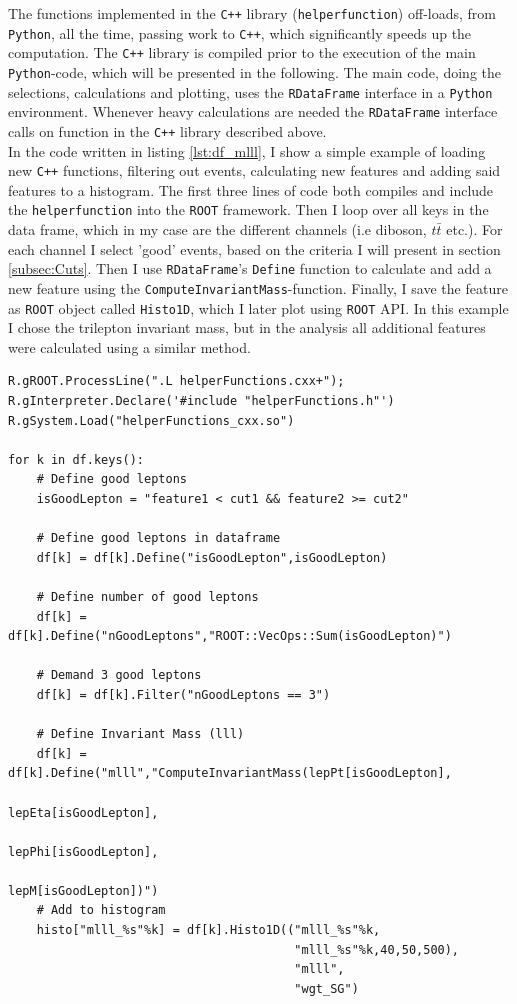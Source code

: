 The functions implemented in the \verb!C++! library (\texttt{helperfunction}) off-loads, from \verb!Python!, all the time, passing work to \verb!C++!,
which significantly speeds up the computation. The \verb!C++! library is compiled prior to the execution of the main \verb!Python!-code, which 
will be presented in the following. The main code, doing the selections, calculations and plotting, uses the \verb!RDataFrame! interface in a \verb!Python! 
environment. Whenever heavy calculations are needed the \verb!RDataFrame! interface calls on function in the \verb!C++! library described above. 
\\
In the code written in listing \ref{lst:df_mlll}, I show a simple example 
of loading new \verb!C++! functions, filtering out events, calculating new features and adding said 
features to a histogram. The first three lines of code both compiles and include the \texttt{helperfunction} 
into the \verb!ROOT! framework. Then I loop over all keys in the data frame, which in my case
are the different channels (i.e diboson, $t\bar{t}$ etc.). For each channel I select 'good' events,
based on the criteria I will present in section \ref{subsec:Cuts}. Then I use \verb!RDataFrame!'s \texttt{Define} function to calculate
and add a new feature using the \texttt{ComputeInvariantMass}-function. Finally, I save the feature as \verb!ROOT! object called 
\texttt{Histo1D}, which I later plot using \verb!ROOT! \ac{API}. In this example I chose the trilepton invariant mass, 
but in the analysis all additional features were calculated using a similar method. 
\lstset{style=Python}
\begin{lstlisting}[caption={Python-file for calling dataframe and calculating the trilepton invariant mass.},captionpos=b, label={lst:df_mlll}]
R.gROOT.ProcessLine(".L helperFunctions.cxx+");
R.gInterpreter.Declare('#include "helperFunctions.h"') 
R.gSystem.Load("helperFunctions_cxx.so")

for k in df.keys():
    # Define good leptons
    isGoodLepton = "feature1 < cut1 && feature2 >= cut2"

    # Define good leptons in dataframe
    df[k] = df[k].Define("isGoodLepton",isGoodLepton)

    # Define number of good leptons
    df[k] = df[k].Define("nGoodLeptons","ROOT::VecOps::Sum(isGoodLepton)")

    # Demand 3 good leptons 
    df[k] = df[k].Filter("nGoodLeptons == 3")

    # Define Invariant Mass (lll)
    df[k] = df[k].Define("mlll","ComputeInvariantMass(lepPt[isGoodLepton], 
                                                      lepEta[isGoodLepton], 
                                                      lepPhi[isGoodLepton], 
                                                      lepM[isGoodLepton])")
    # Add to histogram
    histo["mlll_%s"%k] = df[k].Histo1D(("mlll_%s"%k,
                                        "mlll_%s"%k,40,50,500),
                                        "mlll",
                                        "wgt_SG")     
\end{lstlisting}



